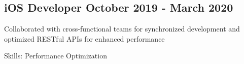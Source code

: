 \subsection{{iOS Developer \hfill October 2019 - March 2020}}
\begin{zitemize}

\setlength\itemsep{0.5em}

\item Collaborated with cross-functional teams for synchronized development and optimized RESTful APIs for enhanced performance

\item[] Skills: Performance Optimization
    
\end{zitemize}
